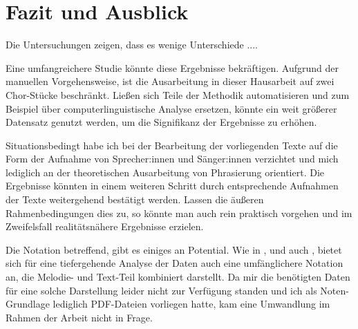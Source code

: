\chapter{Fazit und Ausblick}
\label{chap:Fazit und Ausblick}



Die Untersuchungen zeigen, dass es wenige Unterschiede ....

Eine umfangreichere Studie könnte diese Ergebnisse bekräftigen. Aufgrund der manuellen Vorgehensweise, ist die Ausarbeitung in dieser Hausarbeit auf zwei Chor-Stücke beschränkt. Ließen sich Teile der Methodik automatisieren und zum Beispiel über computerlinguistische Analyse ersetzen, könnte ein weit größerer Datensatz genutzt werden, um die Signifikanz der Ergebnisse zu erhöhen.

Situationsbedingt habe ich bei der Bearbeitung der vorliegenden Texte auf die Form der Aufnahme von Sprecher:innen und Sänger:innen verzichtet und mich lediglich an der theoretischen Ausarbeitung von Phrasierung orientiert. Die Ergebnisse könnten in einem weiteren Schritt durch entsprechende Aufnahmen der Texte weitergehend bestätigt werden. Lassen die äußeren Rahmenbedingungen dies zu, so könnte man auch rein praktisch vorgehen und im Zweifelsfall realitätsnähere Ergebnisse erzielen.

Die Notation betreffend, gibt es einiges an Potential. Wie in \cite{liberman1975intonational}, \cite{lerdahl1983generative} und auch \cite{hayes1996role}, bietet sich für eine tiefergehende Analyse der Daten auch eine umfänglichere Notation an, die Melodie- und Text-Teil kombiniert darstellt. Da mir die benötigten Daten für eine solche Darstellung leider nicht zur Verfügung standen und ich als Noten-Grundlage lediglich PDF-Dateien vorliegen hatte, kam eine Umwandlung im Rahmen der Arbeit nicht in Frage.
